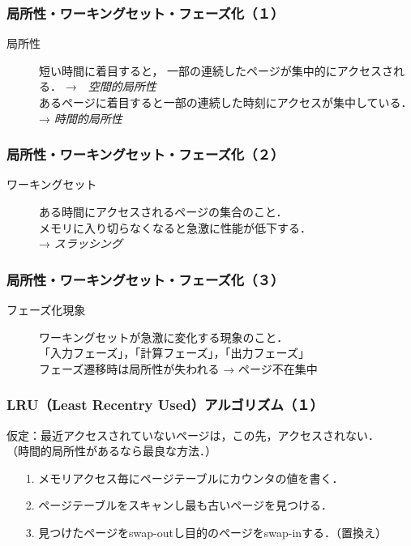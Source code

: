 \documentclass{beamer}                   %
\begin{document}
\begin{frame}
  \frametitle{局所性・ワーキングセット・フェーズ化（１）}
  \begin{description}
  \item[局所性]
    短い時間に着目すると，
    一部の連続したページが集中的にアクセスされる．
    →　\emph{空間的局所性}\\
    あるページに着目すると一部の連続した時刻にアクセスが集中している．
    → \emph{時間的局所性}
  \end{description}
\end{frame}

\begin{frame}
  \frametitle{局所性・ワーキングセット・フェーズ化（２）}
  \begin{description}
  \item[ワーキングセット]
    ある時間にアクセスされるページの集合のこと．\\
    メモリに入り切らなくなると急激に性能が低下する．\\
    → \emph{スラッシング}
  \end{description}
\end{frame}

\begin{frame}
  \frametitle{局所性・ワーキングセット・フェーズ化（３）}
  \begin{description}
  \item[フェーズ化現象]
    ワーキングセットが急激に変化する現象のこと．\\
    「入力フェーズ」，「計算フェーズ」，「出力フェーズ」 \\
    フェーズ遷移時は局所性が失われる → ページ不在集中
\end{description}
\end{frame}

\begin{frame}
  \frametitle{LRU（Least Recentry Used）アルゴリズム（１）}
  仮定：最近アクセスされていないページは，この先，アクセスされない．\\
  （時間的局所性があるなら最良な方法．）
  \begin{enumerate}
  \item[1.] メモリアクセス毎にページテーブルにカウンタの値を書く．
  \item[2.] ページテーブルをスキャンし最も古いページを見つける．
  \item[3.] 見つけたページをswap-outし目的のページをswap-inする．（置換え）
  \end{enumerate}
\end{frame}
\end{document}
